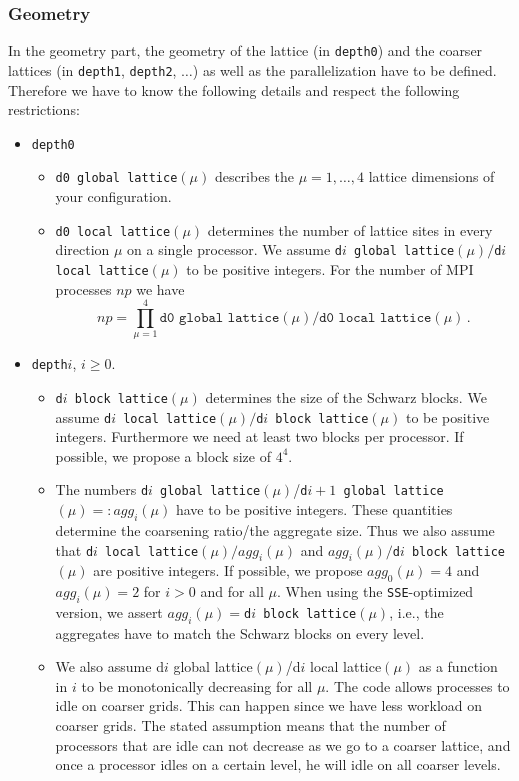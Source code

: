 \documentclass[a4paper,12pt]{scrartcl}
\begin{document}
\subsubsection{Geometry}
In the geometry part, the geometry of the lattice (in \texttt{depth0}) and the coarser lattices (in \texttt{depth1}, \texttt{depth2}, $\ldots$) as well as the parallelization have to be defined. Therefore we have to know the following details and respect the following restrictions:
\begin{itemize}
\item \texttt{depth0}
  \begin{itemize}
    \item \texttt{d0 global lattice}$(\mu)$ describes the $\mu=1,\ldots,4$ lattice dimensions of your configuration.
    \item \texttt{d0 local lattice}$(\mu)$ determines the number of lattice sites in every direction $\mu$ on a single processor. We assume \texttt{d$i$ global lattice}$(\mu)/$\texttt{d$i$ local lattice}$(\mu)$ to be positive integers.
    For the number of MPI processes $np$ we have
    $$ np = \prod_{\mu=1}^4 \texttt{d0 global lattice}(\mu)/\texttt{d0 local lattice}(\mu) \, . $$
  \end{itemize}
\item \texttt{depth$i$}, $i \geq 0$.
  \begin{itemize}
    \item \texttt{d$i$ block lattice}$(\mu)$ determines the size of the Schwarz blocks. We assume \texttt{d$i$ local lattice}$(\mu)/$\texttt{d$i$ block lattice}$(\mu)$ to be positive integers. Furthermore we need at least two blocks per processor. If possible, we propose a block size of $4^4$.
    \item The numbers \texttt{d$i$ global lattice}$(\mu)$/\texttt{d$i+1$ global lattice}$(\mu) =: agg_i(\mu)$ have to be positive integers. These quantities determine the coarsening ratio/the aggregate size. Thus we also assume that \texttt{d$i$ local lattice}$(\mu)/agg_i(\mu)$ and $agg_i(\mu)/$\texttt{d$i$ block lattice}$(\mu)$ are positive integers. If possible, we propose $agg_0(\mu)=4$ and $agg_i(\mu)=2$ for $i>0$ and for all $\mu$. When using the \texttt{SSE}-optimized version, we assert  $agg_i(\mu)=$\texttt{d$i$ block lattice}$(\mu)$, i.e., the aggregates have to match the Schwarz blocks on every level.
    \item We also assume d$i$ global lattice$(\mu)$/d$i$ local lattice$(\mu)$ as a function in $i$ to be monotonically decreasing for all $\mu$. The code allows processes to idle on coarser grids. This can happen since we have less workload on coarser grids. The stated assumption means that the number of processors that are idle can not decrease as we go to a coarser lattice, and once a processor idles on a certain level, he will idle on all coarser levels.    

\end{itemize}
\end{itemize}
\end{document}
